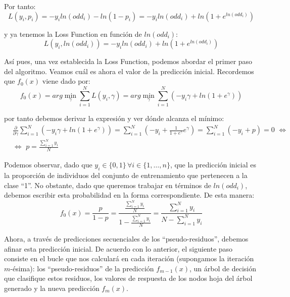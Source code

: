 \documentclass[12pt,twoside]{article}
\begin{document}
Por tanto:
\begin{equation*}
L(y_i, p_i) = -y_i ln(odd_i) - ln(1-p_i) = -y_i ln(odd_i) + ln \left( 1 + e^{ln(odd_i)} \right)
\end{equation*}

\noindent
y ya tenemos la Loss Function en función de $ln(odd_i)$:
\begin{equation*}
L(y_i, ln(odd_i)) = -y_i ln(odd_i) + ln \left( 1 + e^{ln(odd_i)} \right)
\end{equation*}

Así pues, una vez establecida la Loss Function, podemos abordar el primer paso del algoritmo. Veamos cuál es ahora el valor de la predicción inicial. Recordemos que $f_0(x)$ viene dado por:
\begin{equation*}
f_0(x) = arg\min_{\gamma} \sum_{i=1}^N L(y_i, \gamma) = arg\min_{\gamma} \sum_{i=1}^N \left( -y_i \gamma + ln \left( 1 + e^{\gamma} \right) \right)
\end{equation*}

\noindent
por tanto debemos derivar la expresión y ver dónde alcanza el mínimo:
\begin{equation*}
\begin{split}
& \frac{\partial}{\partial \gamma}\sum_{i=1}^N \left( -y_i \gamma + ln \left( 1 + e^{\gamma} \right) \right) = \sum_{i=1}^N \left( -y_i + \frac{1}{1 + e^{\gamma}} e^{\gamma} \right) = \sum_{i=1}^N (-y_i + p) = 0 \, \, \Leftrightarrow  \\
& \Leftrightarrow \, \, p = \frac{\sum_{i=1}^{N} y_i}{N} 
\end{split}
\end{equation*}

Podemos observar, dado que $y_i \in \{0, 1 \} \, \forall i \in \{1, \dots, n \}$, que la predicción inicial es la proporción de individuos del conjunto de entrenamiento que pertenecen a la clase ``1''. No obstante, dado que queremos trabajar en términos de $ln(odd_i)$, debemos escribir esta probabilidad en la forma correspondiente. De esta manera:
\begin{equation*}
f_0(x) = \frac{p}{1-p} = \frac{\frac{\sum_{i=1}^{N} y_i}{N}}{1 - \frac{\sum_{i=1}^{N} y_i}{N}} = \frac{\sum_{i=1}^{N} y_i}{N -\sum_{i=1}^{N} y_i}
\end{equation*}

Ahora, a través de predicciones secuenciales de los ``pseudo-residuos'', debemos afinar esta predicción inicial. De acuerdo con lo anterior, el siguiente paso consiste en el bucle que nos calculará en cada iteración (supongamos la iteración $m$-ésima): los ``pseudo-residuos'' de la predicción $f_{m-1}(x)$, un árbol de decisión que clasifique estos residuos, los valores de respuesta de los nodos hoja del árbol generado y la nueva predicción $f_m(x)$.
\end{document}
